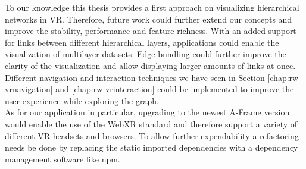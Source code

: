 To our knowledge this thesis provides a first approach on visualizing hierarchical networks in VR. Therefore, future work could further extend our concepts and improve the stability, performance and feature richness.
With an added support for links between different hierarchical layers, applications could enable the visualization of multilayer datasets. Edge bundling could further improve the clarity of the visualization and allow displaying larger amounts of links at once. Different navigation and interaction techniques we have seen in Section \ref{chap:rw-vrnavigation} and \ref{chap:rw-vrinteraction} could be implemented to improve the user experience while exploring the graph.\
\\
As for our application in particular, upgrading to the newest A-Frame version would enable the use of the WebXR standard and therefore support a variety of different VR headsets and browsers. To allow further expendability a refactoring needs be done by replacing the static imported dependencies with a dependency management software like npm.


